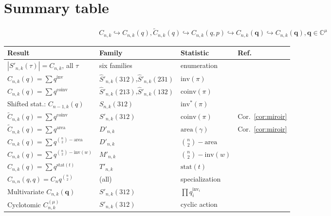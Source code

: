 \documentclass[12pt,a4paper,reqno]{amsart}
\theoremstyle{plain}
\theoremstyle{definition}
\newcommand{\Inv}{\mathrm{inv}}
\newcommand{\Coinv}{\mathrm{coinv}}
\newcommand{\Area}{\mathrm{area}}
\newcommand{\invstar}{\mathrm{inv}^{*}}
\newcommand{\Snk}[1]{S_{n,k}(#1)}
\newcommand{\Snkp}[1]{S'_{n,k}(#1)}
\newcommand{\hSnkp}[1]{\widehat{S}'_{n,k}(#1)}
\newcommand{\Dnk}{D'_{n,k}}
\newcommand{\Mnk}{M'_{n,k}}
\newcommand{\Ctilde}{\widetilde{C}}
\newcommand{\bq}{\mathbf{q}}
\newcommand{\CC}{\mathbb{C}}
\begin{document}
\section{Summary table}\label{sec:table}
\[\begin{array}{l}
C_{n,k}\hookrightarrow C_{n,k}(q),\Ctilde_{n,k}(q)
\hookrightarrow C_{n,k}(q,p)
\hookrightarrow C_{n,k}(\bq)\hookrightarrow C_{n,k}(\bq),\bq\in\CC^\mu
\end{array}\]
\begin{center}\renewcommand{\arraystretch}{1.9}
\begin{tabular}{llll}\toprule
\textbf{Result} & \textbf{Family} & \textbf{Statistic} & \textbf{Ref.}\\\midrule
$|\Snkp{\tau}|=C_{n,k}$, all $\tau$ & six families & enumeration & \cite{W1}\\
$C_{n,k}(q)=\sum q^{\Inv}$ & $\hSnkp{312}$,$\hSnkp{231}$ & $\Inv(\pi)$ & \cite{W3}\\
$C_{n,k}(q)=\sum q^{\Coinv}$ & $\hSnkp{213}$,$\hSnkp{132}$ & $\Coinv(\pi)$ & \cite{W3}\\
Shifted stat.: $C_{n-1,k}(q)$ & $\Snk{312}$ & $\invstar(\pi)$ & \cite{W2}\\
$\Ctilde_{n,k}(q)=\sum q^{\Coinv}$ & $\Snkp{312}$ & $\Coinv(\pi)$ & Cor.~\ref{cor:miroir}\\
$\Ctilde_{n,k}(q)=\sum q^{\Area}$ & $\Dnk$ & $\Area(\gamma)$ & Cor.~\ref{cor:miroir}\\
$C_{n,k}(q)=\sum q^{\binom{n}{2}-\Area}$ & $\Dnk$ & $\binom{n}{2}-\Area$ & \cite{W4}\\
$C_{n,k}(q)=\sum q^{\binom{n}{2}-\Inv(w)}$ & $\Mnk$ & $\binom{n}{2}-\Inv(w)$ & \cite{W4}\\
$C_{n,k}(q)=\sum q^{\mathrm{stat}(t)}$ & $T'_{n,k}$ & $\mathrm{stat}(t)$ & \cite{W4}\\
$C_{n,n}(q,q)=C_nq^{\binom{n}{2}}$ & (all) & specialization & \cite{W5}\\
Multivariate $C_{n,k}(\bq)$ & $\Snkp{312}$ & $\prod q_i^{\mathrm{inv}_i}$ & \cite{W5}\\
Cyclotomic $C_{n,k}^{(\mu)}$ & $\Snkp{312}$ & cyclic action & \cite{W5}\\\bottomrule
\end{tabular}
\end{center}
\end{document}

